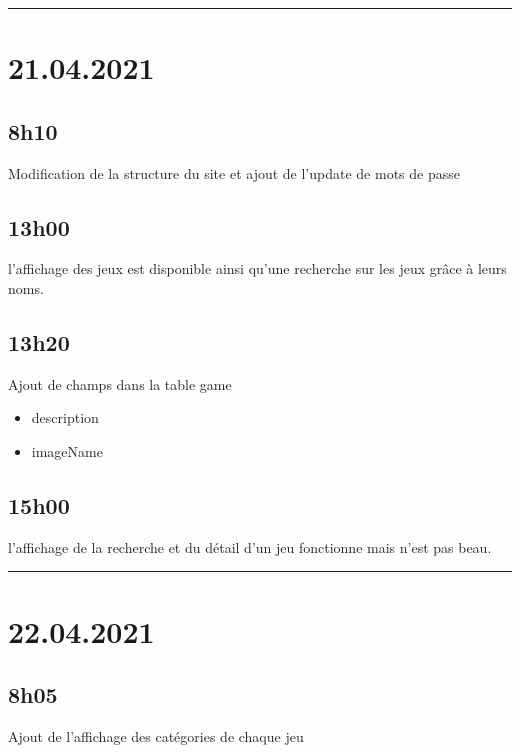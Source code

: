 \documentclass[a4paper,12pt,french]{sphinxmanual}
\begin{document}
\bigskip\hrule\bigskip



\section{21.04.2021}
\label{\detokenize{logbook:id10}}

\subsection{8h10}
\label{\detokenize{logbook:h10}}
\sphinxAtStartPar
Modification de la structure du site et ajout de l’update de mots de passe


\subsection{13h00}
\label{\detokenize{logbook:h00}}
\sphinxAtStartPar
l’affichage des jeux est disponible ainsi qu’une recherche sur les jeux grâce à leurs noms.


\subsection{13h20}
\label{\detokenize{logbook:id11}}
\sphinxAtStartPar
Ajout de champs dans la table game
\begin{itemize}
\item {} 
\sphinxAtStartPar
description

\item {} 
\sphinxAtStartPar
imageName

\end{itemize}


\subsection{15h00}
\label{\detokenize{logbook:id12}}
\sphinxAtStartPar
l’affichage de la recherche et du détail d’un jeu fonctionne mais n’est pas beau.


\bigskip\hrule\bigskip



\section{22.04.2021}
\label{\detokenize{logbook:id13}}

\subsection{8h05}
\label{\detokenize{logbook:id14}}
\sphinxAtStartPar
Ajout de l’affichage des catégories de chaque jeu
\end{document}
